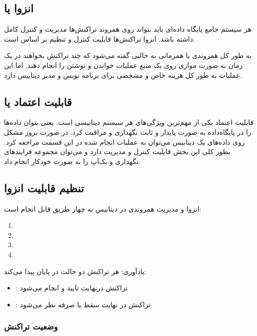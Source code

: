 \documentclass[a4paper]{article}
\begin{document}
\subsection{انزوا یا }

هر سیستم جامع پایگاه داده‌ای باید بتواند روی همروند تراکنش‌ها مدیریت و کنترل
کامل داشته باشد. انزوا تراکنش‌ها قابلیت کنترل و تنظیم بر اساس  است.

به طور کل همروندی یا همزمانی به حالتی گفته می‌شود که چند تراکنش بخواهند در یک
زمان به صورت موازی روی یک منبع عملیات خواندن و نوشتن را انجام دهند. اما این
عملیات به طور کل هزینه خاص و مشخصی برای برنامه نویس و مدیر دیتابیس دارد.

\subsection{قابلیت اعتماد یا }

قابلیت اعتماد یکی از مهم‌ترین ویژگی‌های هر سیستم دیتابیسی است. یعنی بتوان
داده‌ها را در پایگاه‌داده به صورت پایدار و ثابت نگهداری و مراقبت کرد. در صورت
بروز مشکل روی داده‌های یک دیتابیس می‌توان به عملیات انجام شده در این قسمت مراجعه
کرد. بطور کلی این بخش قابلیت کنترل و مدیریت دارد و می‌توان مجموعه فرایند‌های
نگهداری و بک‌آپ را به صورت خودکار انجام داد.

\subsection{تنظیم قابلیت انزوا}

انزوا و مدیریت همروندی در دیتابیس به چهار طریق قابل انجام است:

\begin{enumerate}
    \item {}
    \item {} 
    \item {}
    \item {}
\end{enumerate}

یادآوری: هر تراکنش دو حالت در پایان پیدا می‌کند:

\begin{itemize}
    \item {}: تراکنش درنهایت تایید و انجام می‌شود
    \item {}: تراکنش در نهایت سقط یا صرفه نظر می‌شود
\end{itemize}

\subsubsection{وضعیت تراکنش}
\end{document}
